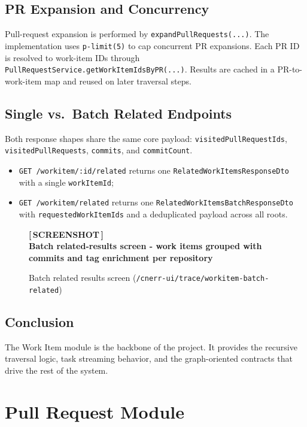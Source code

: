 \documentclass[12pt,a4paper]{report}
\newcommand{\screenshot}[2][Screenshot placeholder]{%
  \begin{figure}[H]
    \centering
    \begin{tcolorbox}[
      enhanced,
      colback=screenshotbg,
      colframe=screenshotborder,
      boxrule=1pt,
      arc=4pt,
      left=4pt, right=4pt, top=4pt, bottom=4pt,
      width=\textwidth,
      height=7cm,
      valign=center,
    ]
      \centering
      \color{primary}
      \large\bfseries [\,SCREENSHOT\,]\\[6pt]
      \normalsize\normalfont\color{darkgray}#1
    \end{tcolorbox}
    \caption{#2}
  \end{figure}%
}
\newcommand{\code}[1]{\texttt{\small\color{codered}#1}}
\begin{document}
\section{PR Expansion and Concurrency}

Pull-request expansion is performed by \code{expandPullRequests(...)}. The
implementation uses \code{p-limit(5)} to cap concurrent PR expansions. Each PR
ID is resolved to work-item IDs through
\code{PullRequestService.getWorkItemIdsByPR(...)}. Results are cached in a
PR-to-work-item map and reused on later traversal steps.

\section{Single vs.\ Batch Related Endpoints}

Both response shapes share the same core payload: \code{visitedPullRequestIds},
\code{visitedPullRequests}, \code{commits}, and \code{commitCount}.

\begin{itemize}
  \item \code{GET /workitem/:id/related} returns one \code{RelatedWorkItemsResponseDto} with a single \code{workItemId};
  \item \code{GET /workitem/related} returns one \code{RelatedWorkItemsBatchResponseDto} with \code{requestedWorkItemIds} and a deduplicated payload across all roots.
\end{itemize}

\screenshot[Batch related-results screen - work items grouped with commits and tag enrichment per repository]{Batch related results screen (\texttt{/cnerr-ui/trace/workitem-batch-related})}

\section{Conclusion}

The Work Item module is the backbone of the project. It provides the recursive
traversal logic, task streaming behavior, and the graph-oriented contracts that
drive the rest of the system.

\chapter{Pull Request Module}
\end{document}
